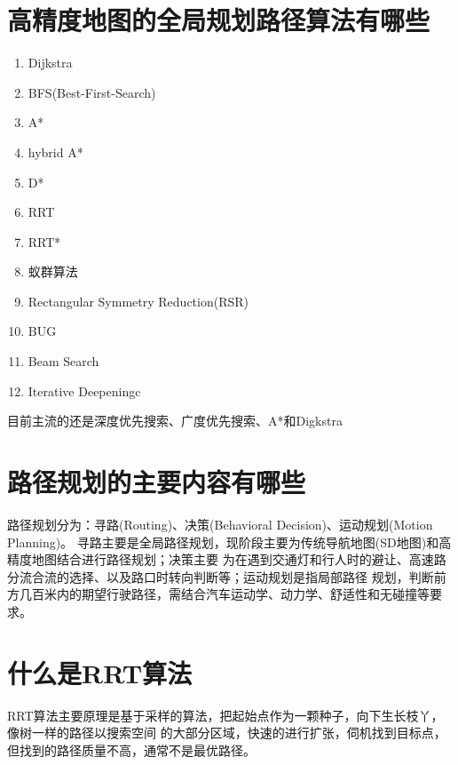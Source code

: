 \documentclass[10pt]{article}
\begin{document}
\section{高精度地图的全局规划路径算法有哪些}
\begin{enumerate}
    \item Dijkstra
    \item BFS(Best-First-Search)
    \item A*
    \item hybrid A*
    \item D*
    \item RRT 
    \item RRT*
    \item 蚁群算法
    \item Rectangular Symmetry Reduction(RSR)
    \item BUG
    \item Beam Search
    \item Iterative Deepeningc
\end{enumerate}
目前主流的还是深度优先搜索、广度优先搜索、A*和Digkstra
\section{路径规划的主要内容有哪些}
路径规划分为：寻路(Routing)、决策(Behavioral Decision)、运动规划(Motion Planning)。
寻路主要是全局路径规划，现阶段主要为传统导航地图(SD地图)和高精度地图结合进行路径规划；决策主要
为在遇到交通灯和行人时的避让、高速路分流合流的选择、以及路口时转向判断等；运动规划是指局部路径
规划，判断前方几百米内的期望行驶路径，需结合汽车运动学、动力学、舒适性和无碰撞等要求。
\section{什么是RRT算法}
RRT算法主要原理是基于采样的算法，把起始点作为一颗种子，向下生长枝丫，像树一样的路径以搜索空间
的大部分区域，快速的进行扩张，伺机找到目标点，但找到的路径质量不高，通常不是最优路径。
\end{document}
